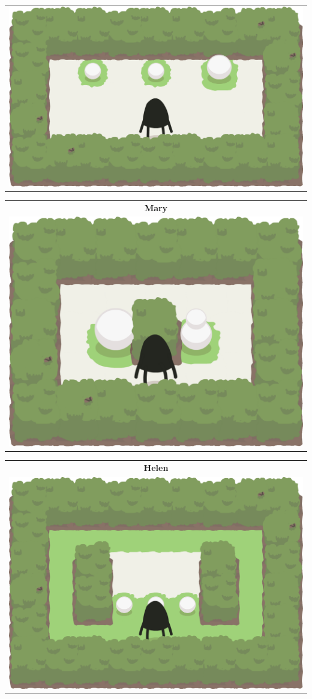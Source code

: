 \documentclass{report}
\theoremstyle{plain}
\begin{document}
\begin{center}
\begin{tabular}{c}
\includegraphics[scale=\levelAnnexWidth]{lydia-1.png}
\end{tabular}
\begin{tabular}{c}
\textbf{Mary} \\
\includegraphics[scale=\levelAnnexWidth]{mary-1.png}
\end{tabular}
\begin{tabular}{c}
\textbf{Helen} \\
\includegraphics[scale=\levelAnnexWidth]{helen-1.png}

\end{tabular}
\end{center}
\end{document}
